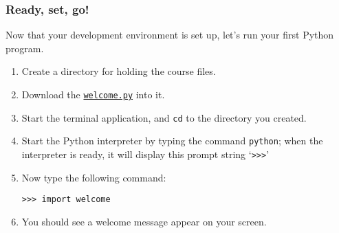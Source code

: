 \documentclass[english,serif,mathserif,xcolor=pdftex,dvipsnames,table]{beamer}
\begin{document}
\begin{frame}[fragile]
  \frametitle{Ready, set, go!}

  Now that your development environment is set up, let's run your
  first Python program.
  \begin{enumerate}
  \item Create a directory for holding the course files.
  \item Download the \href{http://www.gc3.uzh.ch/welcome.py}{\texttt{welcome.py}} into it.
  \item Start the terminal application, and \texttt{cd} to the directory you created.
  \item Start the Python interpreter by typing the command \texttt{python}; when the interpreter is ready, it will display this prompt string `\texttt{>>>}'
  \item Now type the following command:
    \begin{lstlisting}
>>> import welcome
    \end{lstlisting}
  \item You should see a welcome message appear on your screen.
  \end{enumerate}

\end{frame}
\end{document}
